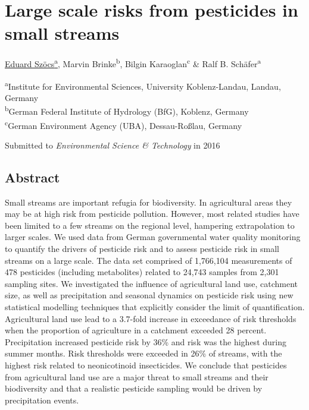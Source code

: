 
\chapter{Large scale risks from pesticides in small streams}
\label{sec:smallstreams}  

\begin{sloppypar}
\bigskip
\underline{Eduard Szöcs\textsuperscript{a}}, Marvin Brinke\textsuperscript{b}, Bilgin Karaoglan\textsuperscript{c} \& Ralf B. Schäfer\textsuperscript{a}

\bigskip
\small
\noindent 
\textsuperscript{a}Institute for Environmental Sciences, University Koblenz-Landau, Landau, Germany \\
\textsuperscript{b}German Federal Institute of Hydrology (BfG), Koblenz, Germany \\
\textsuperscript{c}German Environment Agency (UBA), Dessau-Roßlau, Germany

\bigskip 
\normalsize
\noindent
Submitted to \emph{Environmental Science \& Technology} in 2016

\end{sloppypar}
\newpage


\section{Abstract}
Small streams are important refugia for biodiversity.
In agricultural areas they may be at high risk from pesticide pollution. 
However, most related studies have been limited to a few streams on the regional level, hampering extrapolation to larger scales. 
We used data from German governmental water quality monitoring to quantify the drivers of pesticide risk and to assess pesticide risk in small streams on a large scale. 
The data set comprised of 1,766,104 measurements of 478 pesticides (including metabolites) related to 24,743 samples from 2,301 sampling sites. 
We investigated the influence of agricultural land use, catchment size, as well as precipitation and seasonal dynamics on pesticide risk using new statistical modelling techniques that explicitly consider the limit of quantification. 
Agricultural land use lead to a 3.7-fold increase in exceedance of risk thresholds when the proportion of agriculture in a catchment exceeded 28 percent. 
Precipitation increased pesticide risk by 36\% and risk was the highest during summer months. 
Risk thresholds were exceeded in 26\% of streams, with the highest risk related to neonicotinoid insecticides. 
We conclude that pesticides from agricultural land use are a major threat to small streams and their biodiversity and that a realistic pesticide sampling would be driven by precipitation events. 

